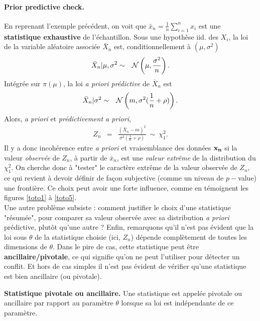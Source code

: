 \paragraph{{\bf Prior predictive check}.} En reprenant l'exemple précédent, on voit que $\bar{x}_n = \frac{1}{n}\sum_{i=1}^n x_i$ est une {\bf statistique exhaustive} de l'échantillon. Sous une hypothèse iid. des $X_i$, la loi de la variable aléatoire associée $\bar{X}_n$ est, conditionnellement à $(\mu,\sigma^2)$
\begin{eqnarray*}
\bar{X}_n|\mu,\sigma^2 & \sim & {\cal{N}}\left(\mu,\frac{\sigma^2}{n}\right).
\end{eqnarray*}   
 Intégrée sur $\pi(\mu)$, la loi {\it a priori prédictive} de $\bar{X}_n$ est
\begin{eqnarray*}
\bar{X}_n|\sigma^2 & \sim & {\cal{N}}\left(m,\sigma^2(\frac{1}{n} + \rho)\right).
\end{eqnarray*}
 Alors, {\it a priori} et {\it prédictivement a priori},
\begin{eqnarray*}
 Z_n & = & \frac{\left(\bar{X}_n - m\right)^2}{\sigma^2(\frac{1}{n} + \rho)}  \ \sim \ \chi^2_1.
\end{eqnarray*}
Il y a donc incohérence entre {\it a priori} et vraisemblance des données ${\bf x_n}$ si la valeur {\it observée} de  $Z_n$, à partir de $\bar{x}_n$, est une \emph{valeur extr\^eme} de la distribution du $\chi^2_1$. On cherche donc à "tester" le caractère extrême de la valeur observée de $Z_n$, ce qui revient à devoir définir de façon subjective (comme un niveau de $p-$value) une frontière. Ce choix peut avoir une forte influence, comme en témoignent les figures \ref{toto1} à \ref{toto5}. \\

Une autre problème subsiste : comment  justifier le choix d'une statistique "résumée", pour comparer sa valeur observée avec sa distribution {\it a priori} prédictive, plutôt qu'une autre ? Enfin, remarquons qu'il n'est pas évident que la loi sous $\theta$ de la statistique choisie (ici, $Z_n$) dépende complètement de toutes les dimensions de $\theta$. Dans le pire de cas, cette statistique peut être {\bf ancillaire/pivotale}, ce qui signifie qu'on ne peut l'utiliser pour détecter un conflit. Et hors de cas simples il n'est pas évident de vérifier qu'une statistique est bien ancillaire (ou pivotale). 

\begin{definition}{\bf Statistique pivotale ou ancillaire.}
Une statistique est appelée pivotale ou ancillaire par rapport au paramètre $\theta$ lorsque sa loi est indépendante de ce paramètre. 
\end{definition}


